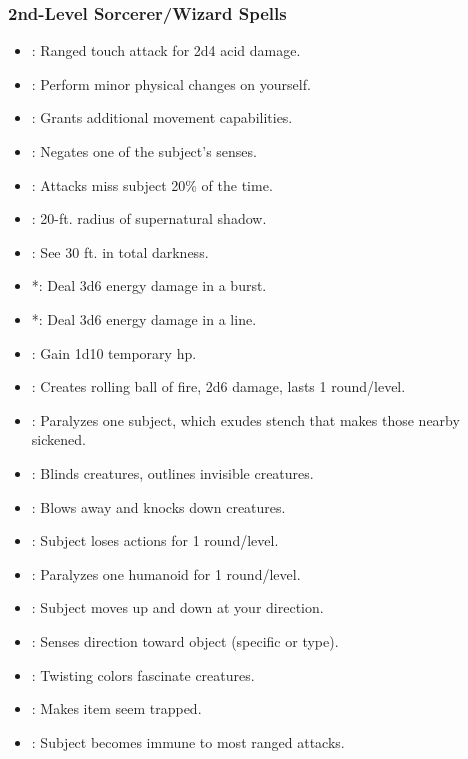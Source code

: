 \subsubsection{2nd-Level Sorcerer/Wizard Spells}
\begin{itemize}
\item {}: Ranged touch attack for 2d4 acid damage.
\item {}: Perform minor physical changes on yourself.
\item {}: Grants additional movement capabilities.
\item {}: Negates one of the subject's senses.
\item {}: Attacks miss subject 20\% of the time.
\item {}: 20-ft. radius of supernatural shadow.
\item {}: See 30 ft. in total darkness.
\item {}*: Deal 3d6 energy damage in a burst.
\item {}*: Deal 3d6 energy damage in a line.
\item {}: Gain 1d10 temporary hp.
\item {}: Creates rolling ball of fire, 2d6 damage, lasts 1 round/level.
\item {}: Paralyzes one subject, which exudes stench that makes those nearby sickened.
\item {}: Blinds creatures, outlines invisible creatures.
\item {}: Blows away and knocks down creatures.
\item {}: Subject loses actions for 1 round/level.
\item {}: Paralyzes one humanoid for 1 round/level.
\item {}: Subject moves up and down at your direction.
\item {}: Senses direction toward object (specific or type).
\item {}: Twisting colors fascinate creatures.
\item {}: Makes item seem trapped.
\item {}: Subject becomes immune to most ranged attacks.

\end{itemize}
